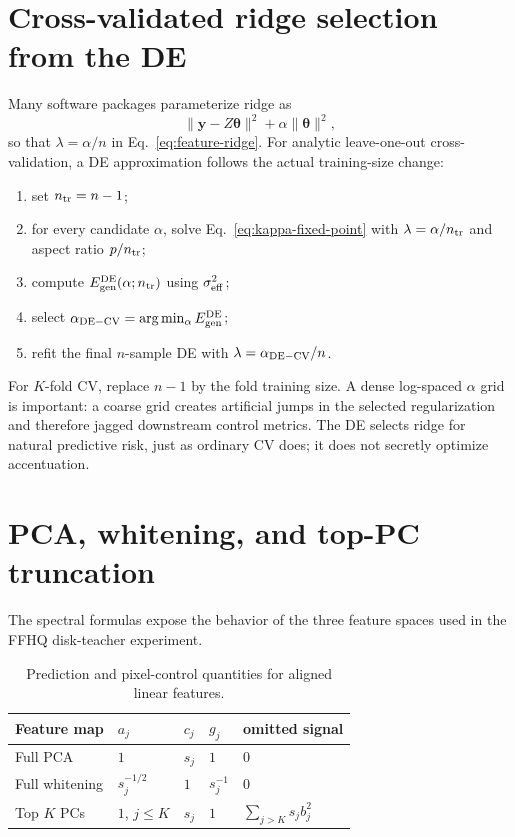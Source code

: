 \documentclass[11pt]{article}
\begin{document}
\section{Cross-validated ridge selection from the DE}

Many software packages parameterize ridge as
\begin{equation}
  \lVert\bm y-Z\bm\theta\rVert^2+\alpha\lVert\bm\theta\rVert^2,
\end{equation}
so that $\lambda=\alpha/n$ in Eq.~\eqref{eq:feature-ridge}.  For analytic
leave-one-out cross-validation, a DE approximation follows the actual
training-size change:
\begin{enumerate}
  \item set $n_{\rm tr}=n-1$;
  \item for every candidate $\alpha$, solve
        Eq.~\eqref{eq:kappa-fixed-point} with
        $\lambda=\alpha/n_{\rm tr}$ and aspect ratio $p/n_{\rm tr}$;
  \item compute $E_{\rm gen}^{\rm DE}(\alpha;n_{\rm tr})$ using
        $\sigma_{\rm eff}^2$;
  \item select
        $\alpha_{\rm DE-CV}=\arg\min_{\alpha}E_{\rm gen}^{\rm DE}$;
  \item refit the final $n$-sample DE with
        $\lambda=\alpha_{\rm DE-CV}/n$.
\end{enumerate}
For $K$-fold CV, replace $n-1$ by the fold training size.  A dense log-spaced
$\alpha$ grid is important: a coarse grid creates artificial jumps in the
selected regularization and therefore jagged downstream control metrics.
The DE selects ridge for natural predictive risk, just as ordinary CV does;
it does not secretly optimize accentuation.

\section{PCA, whitening, and top-PC truncation}

The spectral formulas expose the behavior of the three feature spaces used in
the FFHQ disk-teacher experiment.

\begin{table}[h]
\centering
\small
\begin{tabular}{@{}lllll@{}}
\toprule
Feature map & $a_j$ & $c_j$ & $g_j$ & omitted signal \\
\midrule
Full PCA & $1$ & $s_j$ & $1$ & $0$ \\
Full whitening & $s_j^{-1/2}$ & $1$ & $s_j^{-1}$ & $0$ \\
Top $K$ PCs & $1$, $j\le K$ & $s_j$ & $1$ &
  $\sum_{j>K}s_jb_j^2$ \\
\bottomrule
\end{tabular}
\caption{Prediction and pixel-control quantities for aligned linear features.}
\label{tab:feature-cases}
\end{table}
\end{document}
